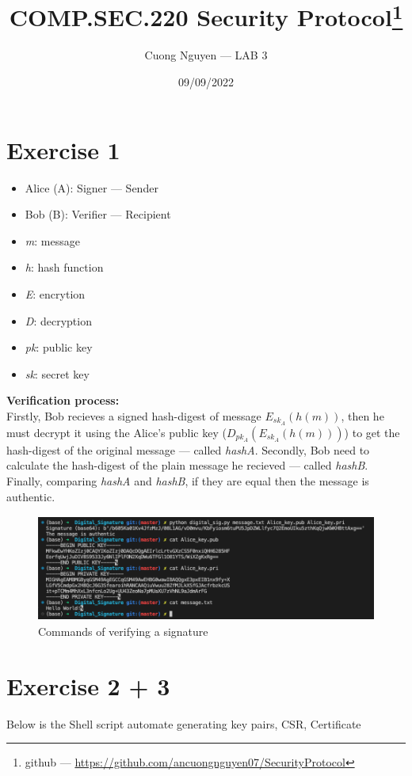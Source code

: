 \documentclass{article}
\title{COMP.SEC.220 Security Protocol\footnote{github --- \url{https://github.com/ancuongnguyen07/SecurityProtocol}}}
\author{Cuong Nguyen --- LAB 3}
\date{09/09/2022}
\begin{document}
    
\maketitle

\section*{Exercise 1}
%
\begin{itemize}
    \item Alice (A): Signer --- Sender
    \item Bob (B): Verifier --- Recipient
    \item \emph{m}: message
    \item \emph{h}: hash function
    \item \emph{E}: encrytion
    \item \emph{D}: decryption
    \item \emph{pk}: public key
    \item \emph{sk}: secret key
\end{itemize}

\textbf{Verification process:}\\
Firstly, Bob recieves a signed hash-digest of message \(E_{sk_{A}}
(h(m))\), then he must decrypt it using the Alice's public key (\(
D_{pk_{A}}(E_{sk_{A}}(h(m)))\)) to get the hash-digest of the original
message --- called \emph{hashA}. Secondly, Bob need to calculate the
hash-digest of the plain message he recieved --- called \emph{hashB}.
Finally, comparing \emph{hashA} and \emph{hashB}, if they are equal then
the message is authentic. 

\begin{figure}[hpt]
    \centering
    \includegraphics[width=\textwidth,height=35mm,keepaspectratio]{ds.png}
    \caption{Commands of verifying a signature}
    \label{fig:ds}
\end{figure}

\section*{Exercise 2 + 3}
%
Below is the Shell script automate generating key pairs, CSR, Certificate

\end{document}
